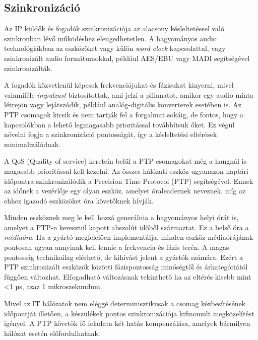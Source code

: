 \subsection{Szinkronizáció}
Az IP küldők és fogadók szinkronizációja az alacsony késleltetéssel való szinkronban lévő működéshez elengedhetetlen.
A hagyományos audio technológiákban az eszközöket vagy külön \textit{word clock} kapcsolattal, 
vagy szinkronizált audio formátumokkal, például AES/EBU vagy MADI segítségével szinkronizálták.

A fogadók közvetlenül képesek frekvenciájukat és fázisukat kinyerni,
mivel valamiféle \textit{impulzust} biztosítottak, ami jelzi a pillanatot, amikor egy
audio minta létrejön vagy lejátszódik, például analóg-digitális konverterek esetében is.
Az PTP csomagok kicsik és nem tartják fel a forgalmat sokáig, de fontos, hogy a
kapcsolókban a lehető legmagasabb prioritással továbbítsuk őket. 
Ez végül növelni fogja a szinkronizáció pontosságát, így a késleltetési eltérések minimalizálódnak.

A QoS (Quality of service) keretein belül a PTP csomagokat még a hangnál is magasabb prioritással kell
kezelni. Az összes hálózati eszköz ugyanazon naptári időpontra szinkronizálódik a Precision Time Protocol
(PTP) segítségével. Ennek az időnek a vezérlője egy olyan eszköz, amelyet óraleadernek
neveznek, míg az ehhez igazodó eszközöket óra követőknek hívják. 

Minden eszköznek meg le kell hozzá generálnia a hagyományos helyi órát is, amelyet a PTP-n keresztül kapott
abszolút időből származtat. Ez a belső óra a \textit{médiaóra}. 
Ha a gyártó megfelelően implementálja, minden eszköz médiaórájának pontosan ugyan annyinak kell lennie a
frekvencia és fázis terén. A magas pontosság technikailag elérhető, de kihívást
jelent a gyártók számára. Ezért a PTP szinkronizált eszközök közötti
fázispontosság minőségtől és árkategóriától függően változhat. Elfogadható változásnak tekinthető ha az
eltérés kisebb mint <1 µs, azaz 1 mikroszekundum.

Mivel az IT hálózatok nem eléggé determinisztikusak a csomag kézbesítésének időpontját
illetően, a készülékek pontos szinkronizációja kifinomult megközelítést igényel.
A PTP követők fő feladata két hatás kompenzálása, amelyek bármilyen hálózat esetén előfordulhatnak:

